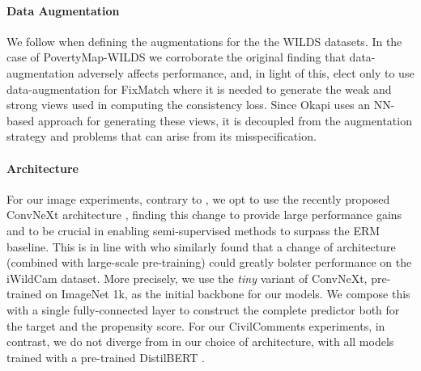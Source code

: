 \paragraph{Data Augmentation} We follow \cite{SagWeiLeeGaoetal22} when defining the augmentations
for the the WILDS datasets.
%
In the case of PovertyMap-WILDS we corroborate the original finding that data-augmentation
adversely affects performance, and, in light of this, elect only to use data-augmentation for
FixMatch where it is needed to generate the weak and strong views used in computing the consistency
loss.
%
Since Okapi uses an NN-based approach for generating these views, it is decoupled from the
augmentation strategy and problems that can arise from its misspecification.

\paragraph{Architecture} For our image experiments, contrary to \cite{SagWeiLeeGaoetal22}, we opt
to use the recently proposed ConvNeXt architecture \citep{liu2022convnet}, finding this change to
provide large performance gains and to be crucial in enabling semi-supervised methods to surpass
the ERM baseline.
%
This is in line with \cite{kim2022broad} who similarly found that a change of architecture
(combined with large-scale pre-training) could greatly bolster performance on the iWildCam dataset.
%
More precisely, we use the \emph{tiny} variant of ConvNeXt, pre-trained on ImageNet 1k, as the
initial backbone for our models. We compose this with a single fully-connected layer to construct
the complete predictor both for the target and the propensity score. For our CivilComments
experiments, in contrast, we do not diverge from \cite{SagWeiLeeGaoetal22} in our choice of
architecture, with all models trained with a pre-trained DistilBERT \citep{sanh2019distilbert}.

